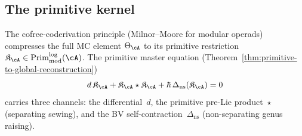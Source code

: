 \subsection{The primitive kernel}
\label{sec:concordance-primitive-kernel}

The cofree-coderivation principle (Milnor--Moore for modular operads)
compresses the full MC element $\Theta_\cA$ to its primitive
restriction $\mathfrak K_\cA \in \operatorname{Prim}^{\log}_{\mathrm{mod}}(\cA)$.
The primitive master equation
(Theorem~\ref{thm:primitive-to-global-reconstruction})
\[
d\,\mathfrak K_\cA + \mathfrak K_\cA \star \mathfrak K_\cA
+ \hbar\,\Delta_{\mathrm{ns}}(\mathfrak K_\cA) = 0
\]
carries three channels: the differential~$d$, the primitive
pre-Lie product~$\star$ (separating sewing), and the BV
self-contraction~$\Delta_{\mathrm{ns}}$ (non-separating genus
raising).

